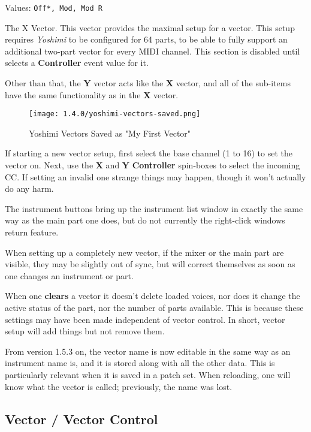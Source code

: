    Values: \texttt{Off*, Mod, Mod R}

   The X Vector.
   This vector provides the maximal setup for a vector.  This setup requires
   \textsl{Yoshimi} to be configured for 64 parts, to be able to fully support
   an additional two-part vector for every MIDI channel.  This section is
   disabled until selects a \textbf{Controller} event value for it.

   Other than that, the \textbf{Y} vector acts like the \textbf{X} vector, and
   all of the sub-items have the same functionality as in the
   \textbf{X} vector.

\begin{figure}[H]
   \centering
   \texttt{[image: 1.4.0/yoshimi-vectors-saved.png]}
   \caption{Yoshimi Vectors Saved as "My First Vector"}
   \label{fig:yoshimi_vectors_saved}
\end{figure}

   If starting a new vector setup, first
   select the base channel (1 to 16) to set the vector on. Next,
   use the \textbf{X} and \textbf{Y} \textbf{Controller}
   spin-boxes to select the incoming CC.
   If setting an invalid one strange things may happen, though it won't
   actually do any harm.

   The instrument buttons bring up the instrument list window in exactly the same
   way as the main part one does, but do not currently the right-click
   windows return feature.

   When setting up a completely new vector, if the mixer or the main part are
   visible, they may be slightly out of sync, but will correct themselves as
   soon as one changes an instrument or part.

   When one \textbf{clears} a vector it doesn't delete loaded voices, nor does
   it change the active status of the part, nor the number of parts available.
   This is because these settings may have been made independent of vector
   control. In short, vector setup will add things but not remove them.

   From version 1.5.3 on, the vector name is now editable in the same way as an
   instrument name is, and it is stored along with all the other data. This is
   particularly relevant when it is saved in a patch set. When reloading, one
   will know what the vector is called; previously, the name was lost.

\subsection{Vector / Vector Control}
\label{subsection:vector_control}

